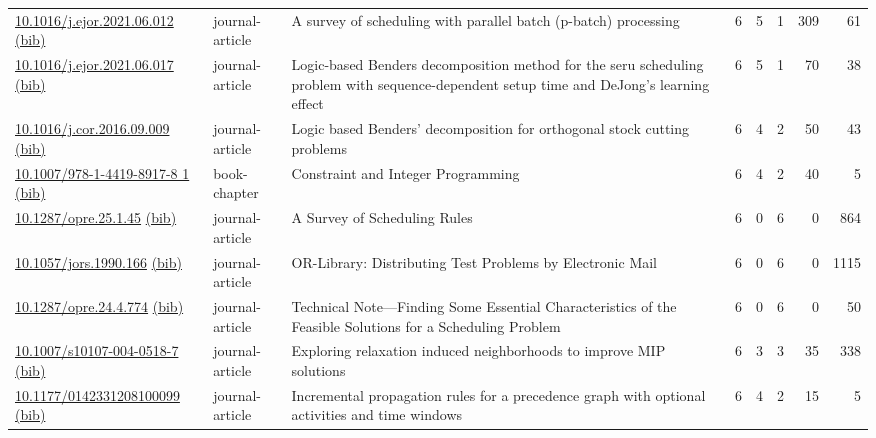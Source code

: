 {\begin{longtable}{p{5cm}lp{11cm}rrrrr}
\href{http://dx.doi.org/10.1016/j.ejor.2021.06.012}{10.1016/j.ejor.2021.06.012} \href{https://www.doi2bib.org/bib/10.1016/j.ejor.2021.06.012}{(bib)} & journal-article & A survey of scheduling with parallel batch (p-batch) processing & 6 & 5 & 1 & 309 & 61 \\
\href{http://dx.doi.org/10.1016/j.ejor.2021.06.017}{10.1016/j.ejor.2021.06.017} \href{https://www.doi2bib.org/bib/10.1016/j.ejor.2021.06.017}{(bib)} & journal-article & Logic-based Benders decomposition method for the seru scheduling problem with sequence-dependent setup time and DeJong's learning effect & 6 & 5 & 1 & 70 & 38 \\
\href{http://dx.doi.org/10.1016/j.cor.2016.09.009}{10.1016/j.cor.2016.09.009} \href{https://www.doi2bib.org/bib/10.1016/j.cor.2016.09.009}{(bib)} & journal-article & Logic based Benders' decomposition for orthogonal stock cutting problems & 6 & 4 & 2 & 50 & 43 \\
\href{http://dx.doi.org/10.1007/978-1-4419-8917-8_1}{10.1007/978-1-4419-8917-8 1} \href{https://www.doi2bib.org/bib/10.1007/978-1-4419-8917-8_1}{(bib)} & book-chapter & Constraint and Integer Programming & 6 & 4 & 2 & 40 & 5 \\
\href{http://dx.doi.org/10.1287/opre.25.1.45}{10.1287/opre.25.1.45} \href{https://www.doi2bib.org/bib/10.1287/opre.25.1.45}{(bib)} & journal-article & A Survey of Scheduling Rules & 6 & 0 & 6 & 0 & 864 \\
\href{http://dx.doi.org/10.1057/jors.1990.166}{10.1057/jors.1990.166} \href{https://www.doi2bib.org/bib/10.1057/jors.1990.166}{(bib)} & journal-article & OR-Library: Distributing Test Problems by Electronic Mail & 6 & 0 & 6 & 0 & 1115 \\
\href{http://dx.doi.org/10.1287/opre.24.4.774}{10.1287/opre.24.4.774} \href{https://www.doi2bib.org/bib/10.1287/opre.24.4.774}{(bib)} & journal-article & Technical Note—Finding Some Essential Characteristics of the Feasible Solutions for a Scheduling Problem & 6 & 0 & 6 & 0 & 50 \\
\href{http://dx.doi.org/10.1007/s10107-004-0518-7}{10.1007/s10107-004-0518-7} \href{https://www.doi2bib.org/bib/10.1007/s10107-004-0518-7}{(bib)} & journal-article & Exploring relaxation induced neighborhoods to improve MIP solutions & 6 & 3 & 3 & 35 & 338 \\
\href{http://dx.doi.org/10.1177/0142331208100099}{10.1177/0142331208100099} \href{https://www.doi2bib.org/bib/10.1177/0142331208100099}{(bib)} & journal-article & Incremental propagation rules for a precedence graph with optional activities and time windows & 6 & 4 & 2 & 15 & 5 \\

\end{longtable}}
